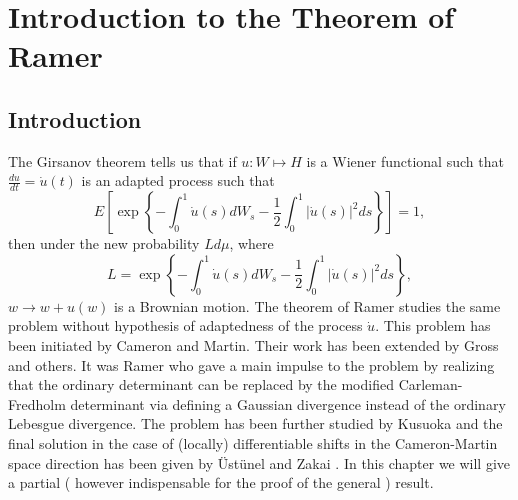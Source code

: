 \documentclass[12pt,a4paper]{book}
\begin{document}


\chapter{Introduction to the Theorem of Ramer}
\label{ch.ramer}

\section*{Introduction}
The Girsanov theorem tells us that if $u:W\mapsto H$ is a Wiener
functional such that $\frac{du}{dt}=\dot{u}(t)$ is an adapted process
such that
$$
E\left[\exp\left\{ -\int_0^1 \dot{u}(s)
  dW_s-\frac{1}{2}\int_0^1|\dot{u}(s)|^2ds\right\}\right]=1,
$$
then under the new probability $Ld\mu$, where
$$
L=\exp\left\{ -\int_0^1 \dot{u}(s)
  dW_s-\frac{1}{2}\int_0^1|\dot{u}(s)|^2ds\right\},
$$
$w\to w+u(w)$ is a Brownian motion. The theorem of Ramer studies the
same problem
without hypothesis of adaptedness of the process $\dot{u}$. This problem has
been initiated by Cameron and Martin. Their work has been  extended by Gross
and others. It was  Ramer \cite{R} who gave a main impulse to the problem by
realizing that the ordinary determinant can be replaced by the modified
Carleman-Fredholm determinant via defining a Gaussian divergence instead of
the ordinary Lebesgue
divergence. The problem has been further studied by Kusuoka \cite{Kus} and the
final solution in the case of (locally) differentiable shifts in the
Cameron-Martin space direction  has been given by \"Ust\"unel and
Zakai \cite{UZ5}.  In this chapter we will give a partial
( however indispensable for the proof of the  general ) result.
\end{document}

